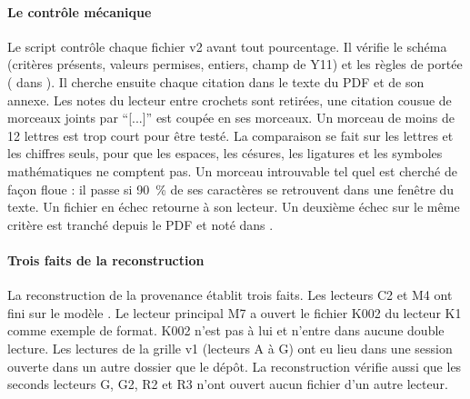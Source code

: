 \paragraph{Le contrôle mécanique}
Le script  contrôle chaque fichier v2 avant tout pourcentage. Il vérifie le
schéma (critères présents, valeurs permises, entiers, champ  de Y11) et les règles de portée
( dans ). Il cherche ensuite chaque citation dans le texte
du PDF et de son annexe. Les notes du lecteur entre crochets sont retirées, une citation cousue de
morceaux joints par \enquote{[...]} est coupée en ses morceaux. Un morceau de moins de 12 lettres
est trop court pour être testé. La comparaison se fait sur les lettres et les chiffres seuls, pour que
les espaces, les césures, les ligatures et les symboles mathématiques ne comptent pas. Un morceau
introuvable tel quel est cherché de façon floue : il passe si 90~\% de ses caractères se retrouvent dans
une fenêtre du texte. Un fichier en échec retourne à son lecteur. Un deuxième échec sur le même critère
est tranché depuis le PDF et noté dans .

\paragraph{Trois faits de la reconstruction}
La reconstruction de la provenance établit trois faits. Les lecteurs C2 et M4
ont fini sur le modèle . Le lecteur principal M7 a ouvert le fichier K002 du
lecteur K1 comme exemple de format. K002 n'est pas à lui et n'entre dans aucune double lecture. Les
lectures de la grille v1 (lecteurs A à G) ont eu lieu dans une session ouverte dans un
autre dossier que le dépôt. La reconstruction vérifie aussi que les seconds lecteurs G, G2, R2 et R3
n'ont ouvert aucun fichier d'un autre lecteur.

